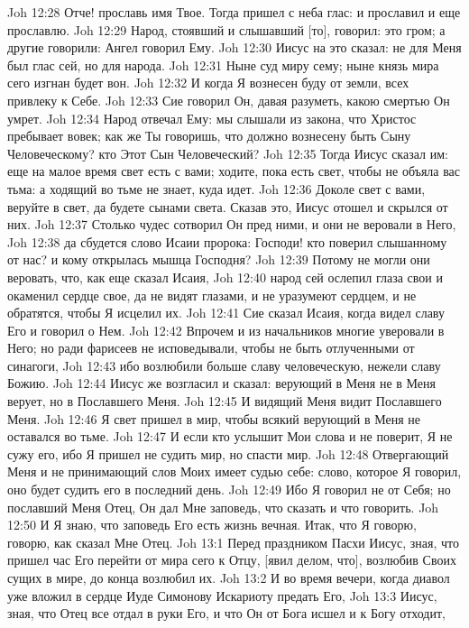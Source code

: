 Joh 12:28  Отче! прославь имя Твое. Тогда пришел с неба глас: и прославил и еще прославлю.
Joh 12:29  Народ, стоявший и слышавший [то], говорил: это гром; а другие говорили: Ангел говорил Ему.
Joh 12:30  Иисус на это сказал: не для Меня был глас сей, но для народа.
Joh 12:31  Ныне суд миру сему; ныне князь мира сего изгнан будет вон.
Joh 12:32  И когда Я вознесен буду от земли, всех привлеку к Себе.
Joh 12:33  Сие говорил Он, давая разуметь, какою смертью Он умрет.
Joh 12:34  Народ отвечал Ему: мы слышали из закона, что Христос пребывает вовек; как же Ты говоришь, что должно вознесену быть Сыну Человеческому? кто Этот Сын Человеческий?
Joh 12:35  Тогда Иисус сказал им: еще на малое время свет есть с вами; ходите, пока есть свет, чтобы не объяла вас тьма: а ходящий во тьме не знает, куда идет.
Joh 12:36  Доколе свет с вами, веруйте в свет, да будете сынами света. Сказав это, Иисус отошел и скрылся от них.
Joh 12:37  Столько чудес сотворил Он пред ними, и они не веровали в Него,
Joh 12:38  да сбудется слово Исаии пророка: Господи! кто поверил слышанному от нас? и кому открылась мышца Господня?
Joh 12:39  Потому не могли они веровать, что, как еще сказал Исаия,
Joh 12:40  народ сей ослепил глаза свои и окаменил сердце свое, да не видят глазами, и не уразумеют сердцем, и не обратятся, чтобы Я исцелил их.
Joh 12:41  Сие сказал Исаия, когда видел славу Его и говорил о Нем.
Joh 12:42  Впрочем и из начальников многие уверовали в Него; но ради фарисеев не исповедывали, чтобы не быть отлученными от синагоги,
Joh 12:43  ибо возлюбили больше славу человеческую, нежели славу Божию.
Joh 12:44  Иисус же возгласил и сказал: верующий в Меня не в Меня верует, но в Пославшего Меня.
Joh 12:45  И видящий Меня видит Пославшего Меня.
Joh 12:46  Я свет пришел в мир, чтобы всякий верующий в Меня не оставался во тьме.
Joh 12:47  И если кто услышит Мои слова и не поверит, Я не сужу его, ибо Я пришел не судить мир, но спасти мир.
Joh 12:48  Отвергающий Меня и не принимающий слов Моих имеет судью себе: слово, которое Я говорил, оно будет судить его в последний день.
Joh 12:49  Ибо Я говорил не от Себя; но пославший Меня Отец, Он дал Мне заповедь, что сказать и что говорить.
Joh 12:50  И Я знаю, что заповедь Его есть жизнь вечная. Итак, что Я говорю, говорю, как сказал Мне Отец.
Joh 13:1  Перед праздником Пасхи Иисус, зная, что пришел час Его перейти от мира сего к Отцу, [явил делом, что], возлюбив Своих сущих в мире, до конца возлюбил их.
Joh 13:2  И во время вечери, когда диавол уже вложил в сердце Иуде Симонову Искариоту предать Его,
Joh 13:3  Иисус, зная, что Отец все отдал в руки Его, и что Он от Бога исшел и к Богу отходит,
